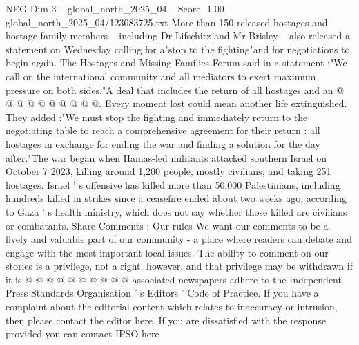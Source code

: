 \begin{textsample}{NEG Dim 3 – global\_north\_2025\_04 – Score -1.00 – global\_north\_2025\_04/123083725.txt}
More than 150 released hostages and hostage family members -- including Dr Lifschitz and Mr Brisley -- also released a statement on Wednesday calling for a"stop to the fighting"and for negotiations to begin again.
The Hostages and Missing Families Forum said in a statement :"We call on the international community and all mediators to exert maximum pressure on both sides."A deal that includes the return of all hostages and an @ @ @ @ @ @ @ @ @ @.
Every moment lost could mean another life extinguished.
They added :"We must stop the fighting and immediately return to the negotiating table to reach a comprehensive agreement for their return : all hostages in exchange for ending the war and finding a solution for the day after."The war began when Hamas-led militants attacked southern Israel on October 7 2023, killing around 1,200 people, mostly civilians, and taking 251 hostages.
Israel ' s offensive has killed more than 50,000 Palestinians, including hundreds killed in strikes since a ceasefire ended about two weeks ago, according to Gaza ' s health ministry, which does not say whether those killed are civilians or combatants.
Share Comments : Our rules We want our comments to be a lively and valuable part of our community - a place where readers can debate and engage with the most important local issues.
The ability to comment on our stories is a privilege, not a right, however, and that privilege may be withdrawn if it is @ @ @ @ @ @ @ @ @ @ associated newspapers adhere to the Independent Press Standards Organisation ' s Editors ' Code of Practice.
If you have a complaint about the editorial content which relates to inaccuracy or intrusion, then please contact the editor here.
If you are dissatisfied with the response provided you can contact IPSO here

\end{textsample}
